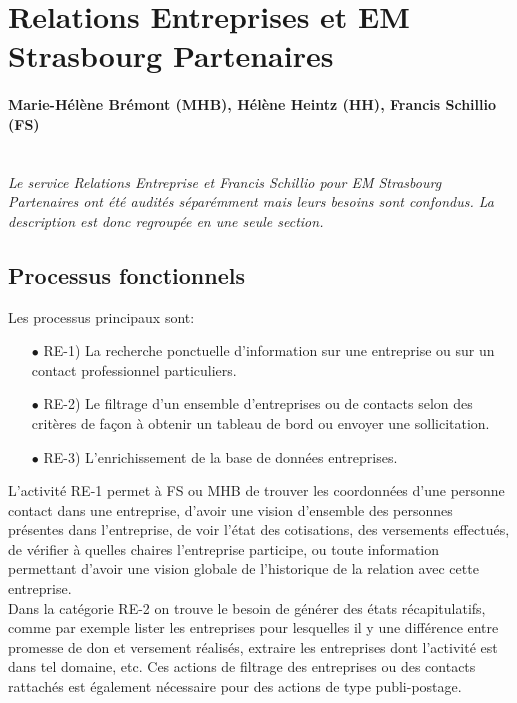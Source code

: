 \documentclass{book}
\begin{document}

\section{Relations Entreprises et EM Strasbourg Partenaires}

\paragraph{Marie-Hélène Brémont (MHB), Hélène Heintz (HH), Francis Schillio (FS)}
~\\

\textit{Le service Relations Entreprise et Francis Schillio pour 
EM Strasbourg Partenaires ont été audités séparémment mais leurs 
besoins sont confondus. La description est donc regroupée en une 
seule section.}


\subsection{Processus fonctionnels}

Les processus principaux sont:
\begin{itemize}
\item[$\bullet$] RE-1) La recherche ponctuelle d'information sur une entreprise 
			     ou sur un contact professionnel particuliers.
\item[$\bullet$] RE-2) Le filtrage d'un ensemble d'entreprises ou de contacts
			     selon des critères de façon à obtenir un tableau de bord
			     ou envoyer une sollicitation. 
\item[$\bullet$] RE-3) L'enrichissement de la base de données entreprises.
\end{itemize}

\bigskip

L'activité RE-1 permet à FS ou MHB de trouver les coordonnées d'une personne
contact dans une entreprise, d'avoir une vision d'ensemble des personnes 
présentes dans l'entreprise, de voir l'état des cotisations, des versements
effectués, de vérifier à quelles chaires l'entreprise participe, ou toute
information permettant d'avoir une vision globale de l'historique de la 
relation avec cette entreprise.\\

Dans la catégorie RE-2 on trouve le besoin de générer des états récapitulatifs,
comme par exemple lister les entreprises pour lesquelles il y une différence
entre promesse de don et versement réalisés, extraire les entreprises dont 
l'activité est dans tel domaine, etc. Ces actions de filtrage des entreprises
ou des contacts rattachés est également nécessaire pour des actions de 
type publi-postage.\\
\end{document}
